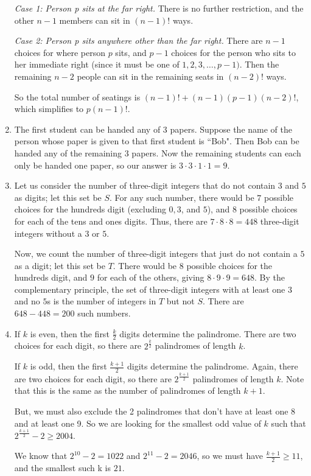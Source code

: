 \documentclass[12pt, letterpaper]{article}
\begin{document}
\begin{enumerate}
    \quad \textit{Case 1: Person p sits at the far right.} There is no further restriction, and the other $n-1$ members can sit in $(n-1)!$ ways.
    
    \quad \textit{Case 2: Person p sits anywhere other than the far right.} There are $n-1$ choices for where person $p$ sits, and $p-1$ choices for the person who sits to her immediate right (since it must be one of $1, 2, 3,\ldots,p-1)$. Then the remaining $n-2$ people can sit in the remaining seats in $(n-2)!$ ways.
    
    So the total number of seatings is $(n-1)! + (n-1)(p-1)(n-2)!$, which simplifies to $\boxed{p(n-1)!}$.
    \item The first student can be handed any of 3 papers. Suppose the name of the person whose paper is given to that first student is ``Bob". Then Bob can be handed any of the remaining 3 papers. Now the remaining students can each only be handed one paper, so our answer is $3\cdot 3\cdot 1\cdot 1 = \boxed{9}$.
    \item Let us consider the number of three-digit integers that do not contain $3$ and $5$ as digits; let this set be $S$. For any such number, there would be $7$ possible choices for the hundreds digit (excluding $0,3$, and $5$), and $8$ possible choices for each of the tens and ones digits. Thus, there are $7 \cdot 8 \cdot 8 = 448$ three-digit integers without a $3$ or $5$.

    Now, we count the number of three-digit integers that just do not contain a $5$ as a digit; let this set be $T$. There would be $8$ possible choices for the hundreds digit, and $9$ for each of the others, giving $8 \cdot 9 \cdot 9 = 648$. By the complementary principle, the set of three-digit integers with at least one $3$ and no $5$s is the number of integers in $T$ but not $S$. There are $648 - 448 = \boxed{200}$ such numbers.
    \item If $k$ is even, then the first $\frac{k}{2}$ digits determine the palindrome. There are two choices for each digit, so there are $2^{\frac{k}{2}}$ palindromes of length $k$.
    
    If $k$ is odd, then the first $\frac{k+1}{2}$ digits determine the palindrome. Again, there are two choices for each digit, so there are $2^{\frac{k+1}{2}}$ palindromes of length $k$. Note that this is the same as the number of palindromes of length $k+1$.
    
    But, we must also exclude the 2 palindromes that don't have at least one 8 and at least one 9. So we are looking for the smallest odd value of $k$ such that $2^\frac{k+1}{2} - 2 \ge 2004$.
    
    We know that $2^{10}-2=1022$ and $2^{11}-2 = 2046$, so we must have $\frac{k+1}{2} \ge 11$, and the smallest such k is $\boxed{21}$.
\end{enumerate}
\end{document}
